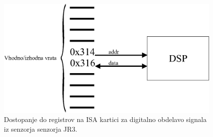 \begin{figure}[!h]
	\centering
	\includegraphics[scale=0.5]{./Slike/dsp-registers.eps}
	\caption{Dostopanje do registrov na ISA kartici za digitalno obdelavo signala iz senzorja senzorja JR3.}
	\label{fig:dsp-registers}
\end{figure}
